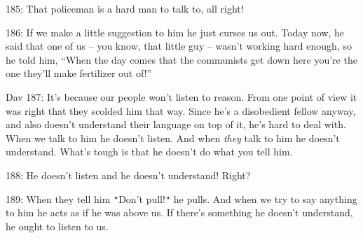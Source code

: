 {185: That policeman is a hard man to talk to, all right! }

{186: If we make a little suggestion to him he just curses us out. Today
now, he said that one of us -- you know, that little guy -- wasn't working hard
enough, so he told him, ``When the day comes that the communists get down here
you're the one they'll make fertilizer out of!''}

{Dav 187: It's because our people won't listen to reason. From one point
of view it was right that they scolded him that way. Since he's a disobedient fellow
anyway, and also doesn't understand their language on top of it, he's hard to deal
with. When we talk to him he doesn't listen. And when }{\textit{they}}{
talk to him he doesn't understand. What's tough is that he doesn't do what you
tell him.  }

{188: He doesn't listen and he doesn't understand! Right?}

{189: When they tell him \texttt{"}Don't pull!\texttt{"} he pulls. And when
we try to say anything to him he acts as if he was above us. If there's something
he doesn't understand, he ought to listen to us. }

